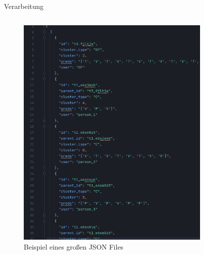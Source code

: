 \documentclass[compress,12pt]{beamer}
\begin{document}
    \begin{frame}{Verarbeitung}
        \begin{columns}
            \begin{column}{0.5\textwidth}
                \begin{figure}
                    \centering
                    \includegraphics[width=\textwidth]{../images/json-file-example}
                    \caption{Beispiel eines großen JSON Files}
                    \label{fig:json-file-example}
                \end{figure}
            \end{column}
            \begin{column}{0.5\textwidth}
                \begin{figure}
                    \centering

\end{figure}
\end{column}
\end{columns}
\end{frame}
\end{document}
